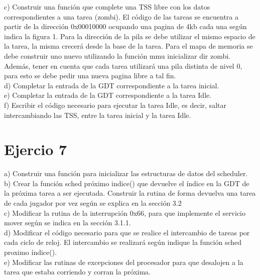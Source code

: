 \documentclass[a4paper]{article}
\begin{document}
{\large c)} Construir una funci\'on que complete una TSS libre con los datos correspondientes a una
tarea (zombi). El c\'odigo de las tareas se encuentra a partir de la direcci\'on 0x00010000
ocupando una pagina de 4kb cada una seg\'un indica la figura 1. Para la direcci\'on de la
pila se debe utilizar el mismo espacio de la tarea, la misma crecer\'a desde la base de la tarea. Para el mapa de memoria se debe construir uno nuevo utilizando la funci\'on
mmu inicializar dir zombi. Adem\'as, tener en cuenta que cada tarea utilizar\'a una pila
distinta de nivel 0, para esto se debe pedir una nueva pagina libre a tal fin. \\

d) Completar la entrada de la GDT correspondiente a la tarea inicial.\\

e) Completar la entrada de la GDT correspondiente a la tarea Idle.\\

f) Escribir el c\'odigo necesario para ejecutar la tarea Idle, es decir, saltar intercambiando las
TSS, entre la tarea inicial y la tarea Idle.


\newpage
\section{Ejercio 7}
{\large a)} Construir una funci\'on para inicializar las estructuras de datos del scheduler.\\

{\large b)} Crear la funci\'on sched pr\'oximo indice() que devuelve el \'indice en la GDT de la pr\'oxima
tarea a ser ejecutada. Construir la rutina de forma devuelva una tarea de cada jugador
por vez seg\'un se explica en la secci\'on 3.2\\

{\large c)} Modificar la rutina de la interrupci\'on 0x66, para que implemente el servicio mover seg\'un
se indica en la secci\'on 3.1.1.\\

{\large d)} Modificar el c\'odigo necesario para que se realice el intercambio de tareas por cada ciclo de
reloj. El intercambio se realizar\'a seg\'un indique la funci\'on sched proximo \'indice().\\

{\large e)} Modificar las rutinas de excepciones del procesador para que desalojen a la tarea que
estaba corriendo y corran la pr\'oxima.\\
\end{document}
